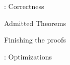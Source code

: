 \begin{frame}{\secname: Correctness}

  \begin{alertblock}{Admitted Theorems}
  \end{alertblock}
  \vfill
  \begin{exampleblock}{Finishing the proofs}
    \\
  \end{exampleblock}
  
\end{frame}

\begin{frame}{\secname: Optimizations}


\end{frame}
